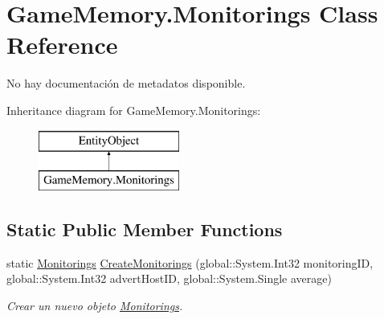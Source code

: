 \hypertarget{class_game_memory_1_1_monitorings}{\section{Game\-Memory.\-Monitorings Class Reference}
\label{class_game_memory_1_1_monitorings}
}


No hay documentación de metadatos disponible.  


Inheritance diagram for Game\-Memory.\-Monitorings\-:\begin{figure}[H]
\begin{center}
\leavevmode
\includegraphics[height=2.000000cm]{class_game_memory_1_1_monitorings}
\end{center}
\end{figure}
\subsection*{Static Public Member Functions}
\begin{DoxyCompactItemize}
\item 
static \hyperlink{class_game_memory_1_1_monitorings}{Monitorings} \hyperlink{class_game_memory_1_1_monitorings_a6ba5e22e9d4a9030a9af1c33c0eb7627}{Create\-Monitorings} (global\-::\-System.\-Int32 monitoring\-I\-D, global\-::\-System.\-Int32 advert\-Host\-I\-D, global\-::\-System.\-Single average)
\begin{DoxyCompactList}\small\item\em Crear un nuevo objeto \hyperlink{class_game_memory_1_1_monitorings}{Monitorings}. \end{DoxyCompactList}\end{DoxyCompactItemize}
